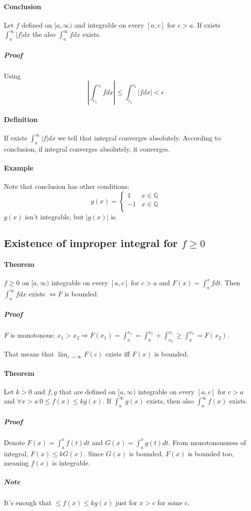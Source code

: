 \paragraph{Conclusion}Let $f$ defined on $[a, \infty)$ and integrable on every $[a,c]$ for $c>a$. If exists $\int_a^\infty \left| f \right| dx $ the also $\int_a^\infty f dx$ exists.
\subparagraph{Proof} Using $$\left| \int_{c_1}^{c_2} f dx \right| \leq \int_{c_1}^{c_2} \left|  f dx \right| < \epsilon $$
\paragraph{Definition} If exists $\int_a^\infty |f| dx$ we tell that integral converges absolutely. According to conclusion, if integral converges absolutely, it converges.
\paragraph{Example} Note that conclusion has other conditions:
$$g(x)  =\begin{cases}
1&x\in \mathbb{Q}\\
-1&x\in \mathbb{Q}\\
\end{cases}$$
$g(x)$ isn't integrable, but $|g(x)|$ is.
\subsection{Existence of improper integral for $f\geq0$}
\paragraph{Theorem} $f\geq 0$ on $[a, \infty)$ integrable on every $[a,c]$ for $c>a$ and $F(x) = \int_a^x f dt$. Then $\int_a^\infty f dx$ exists $\iff F$ is bounded.
\subparagraph{Proof} $F$ is monotonous: $x_1 > x_2  \Rightarrow F(x_1) = \int_a^{x_1} = \int_a^{x_2} + \int_{x_2}^{x_1} \geq \int_a^{x_2} = F(x_2)$.

That means that $\lim_{c\to \infty} F(c)$ exists iff $F(x)$ is bounded.
\paragraph{Theorem} Let $k>0$ and $f,g$ that are defined  on $[a, \infty)$ integrable on every $[a,c]$ for $c>a$ and $\forall x>a \:0 \leq f(x) \leq kg(x)$. If $\int_a^\infty g(x)$ exists, then also $\int_a^\infty f(x)$ exists.
\subparagraph{Proof} Denote $F(x)=\int_a^x f(t) dt$ and $G(x)=\int_a^x g(t) dt$. From monotonousness of integral, $F(x) \leq kG(x)$. Since $G(x)$ is bounded, $F(x)$ is bounded too, meaning $f(x)$ is integrable.
\subparagraph{Note} It's enough that $\leq f(x) \leq kg(x)$ just for $x>c$ for some c.
